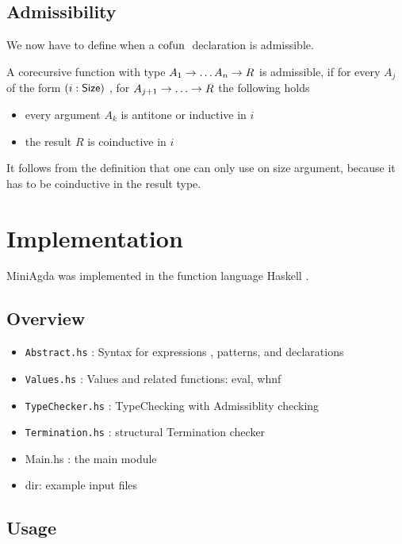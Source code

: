 \section{Admissibility}
We now have to define when a $\mathrm{cofun}\;$ declaration is admissible.
\begin{definition}
A corecursive function with type $ A_1 \rightarrow \dots A_n \rightarrow R $ is admissible, if
for every $A_j$ of the form $(i : \mathsf{Size} )$ , for $A_{j + 1} \ra \dots \ra R $ the following holds 
\begin{itemize}
\item
every argument $A_k$ is antitone or inductive in $i$
\item
the result $R$ is coinductive in $i$  
\end{itemize}
\end{definition}
It follows from the definition that one can only use on size argument, because it has to be coinductive in the result type.
\chapter{Implementation}
MiniAgda was implemented in the function language Haskell \cite{haskell}.
\section{Overview}
\begin{itemize}
\item
\texttt{Abstract.hs} : Syntax for expressions , patterns, and declarations
\item
\texttt{Values.hs} : Values and related functions: eval, whnf 
\item
\texttt{TypeChecker.hs} : TypeChecking with Admissiblity checking
\item
\texttt{Termination.hs} : structural Termination checker
\item
Main.hs : the main module
\item
{} dir: example input files
\end{itemize}

\section{Usage}

